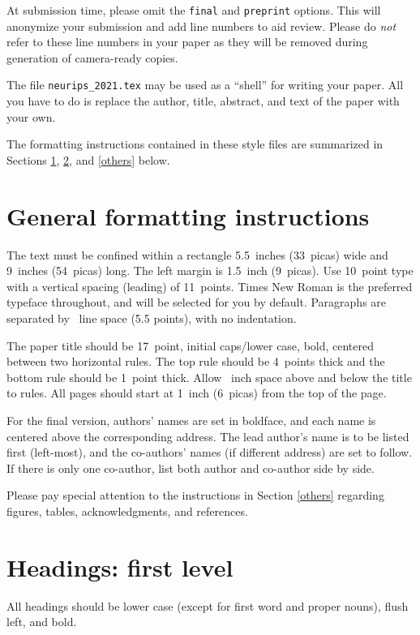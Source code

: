 \documentclass{article}
\begin{document}
At submission time, please omit the \verb+final+ and \verb+preprint+
options. This will anonymize your submission and add line numbers to aid
review. Please do \emph{not} refer to these line numbers in your paper as they
will be removed during generation of camera-ready copies.

The file \verb+neurips_2021.tex+ may be used as a ``shell'' for writing your
paper. All you have to do is replace the author, title, abstract, and text of
the paper with your own.

The formatting instructions contained in these style files are summarized in
Sections \ref{gen_inst}, \ref{headings}, and \ref{others} below.

\section{General formatting instructions}
\label{gen_inst}

The text must be confined within a rectangle 5.5~inches (33~picas) wide and
9~inches (54~picas) long. The left margin is 1.5~inch (9~picas).  Use 10~point
type with a vertical spacing (leading) of 11~points.  Times New Roman is the
preferred typeface throughout, and will be selected for you by default.
Paragraphs are separated by ~line space (5.5 points), with no
indentation.

The paper title should be 17~point, initial caps/lower case, bold, centered
between two horizontal rules. The top rule should be 4~points thick and the
bottom rule should be 1~point thick. Allow ~inch space above and
below the title to rules. All pages should start at 1~inch (6~picas) from the
top of the page.

For the final version, authors' names are set in boldface, and each name is
centered above the corresponding address. The lead author's name is to be listed
first (left-most), and the co-authors' names (if different address) are set to
follow. If there is only one co-author, list both author and co-author side by
side.

Please pay special attention to the instructions in Section \ref{others}
regarding figures, tables, acknowledgments, and references.

\section{Headings: first level}
\label{headings}

All headings should be lower case (except for first word and proper nouns),
flush left, and bold.
\end{document}
